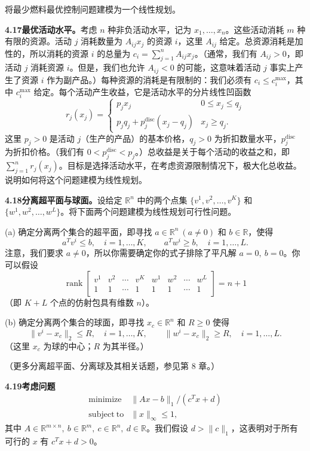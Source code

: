 \documentclass[UTF8, 12pt, fontset=fandol, oneside]{ctexart}
\begin{document}
将最少燃料最优控制问题建模为一个线性规划。

\noindent\textbf{4.17\quad 最优活动水平。}\quad 考虑 $n$ 种非负活动水平，记为 $x_1,\ldots,x_n$。这些活动消耗 $m$ 种有限的资源。活动 $j$ 消耗数量为 $A_{ij}x_j$ 的资源 $i$，这里 $A_{ij}$ 给定。总资源消耗是加性的，所以消耗的资源 $i$ 的总量为 $c_i=\sum_{j=1}^n A_{ij}x_j$。（通常，我们有 $A_{ij}>0$，即活动 $j$ 消耗资源 $i$。但是，我们也允许 $A_{ij}<0$ 的可能，这意味着活动 $j$ 事实上产生了资源 $i$ 作为副产品。）每种资源的消耗是有限制的：我们必须有 $c_i\leq c_i^{\max}$，其中 $c_i^{\max}$ 给定。每个活动产生收益，它是活动水平的分片线性凹函数
\[
r_j(x_j)=
\begin{cases}
p_jx_j & 0\leq x_j\leq q_j\\
p_jq_j+p_j^{\mathrm{disc}}(x_j-q_j) & x_j\geq q_j.
\end{cases}
\]
这里 $p_j>0$ 是活动 $j$（生产的产品）的基本价格，$q_j>0$ 为折扣数量水平，$p_j^{\mathrm{disc}}$ 为折扣价格。（我们有 $0<p_j^{\mathrm{disc}}<p_j$。）总收益是关于每个活动的收益之和，即 $\sum_{j=1}^n r_j(x_j)$。目标是选择活动水平，在考虑资源限制情况下，极大化总收益。说明如何将这个问题建模为线性规划。

\noindent\textbf{4.18\quad 分离超平面与球面。}\quad 设给定 $\mathbb{R}^n$ 中的两个点集 $\{v^1,v^2,\ldots,v^K\}$ 和 $\{w^1,w^2,\ldots,w^L\}$。将下面两个问题建模为线性规划可行性问题。

(a) 确定分离两个集合的超平面，即寻找 $a\in\mathbb{R}^n\ (a\neq0)$ 和 $b\in\mathbb{R}$，使得
\[
a^Tv^i\leq b,\quad i=1,\ldots,K,\qquad a^Tw^i\geq b,\quad i=1,\ldots,L.
\]
注意，我们要求 $a\neq0$，所以你需要确定你的式子排除了平凡解 $a=0,\ b=0$。你可以假设
\[
\operatorname{rank}\begin{bmatrix}
v^1 & v^2 & \cdots & v^K & w^1 & w^2 & \cdots & w^L\\
1 & 1 & \cdots & 1 & 1 & 1 & \cdots & 1
\end{bmatrix}=n+1
\]
（即 $K+L$ 个点的仿射包具有维数 $n$）。

(b) 确定分离两个集合的球面，即寻找 $x_c\in\mathbb{R}^n$ 和 $R\geq0$ 使得
\[
\|v^i-x_c\|_2\leq R,\quad i=1,\ldots,K,\qquad \|w^i-x_c\|_2\geq R,\quad i=1,\ldots,L.
\]
（这里 $x_c$ 为球的中心；$R$ 为其半径。）

（更多分离超平面、分离球及其相关话题，参见第 8 章。）

\noindent\textbf{4.19\quad 考虑问题}
\[
\begin{array}{ll}
\mathop{\mathrm{minimize}} & \|Ax-b\|_1/(c^Tx+d)\\
\mathrm{subject\ to} & \|x\|_\infty\leq1,
\end{array}
\]
其中 $A\in\mathbb{R}^{m\times n},\ b\in\mathbb{R}^m,\ c\in\mathbb{R}^n,\ d\in\mathbb{R}$。我们假设 $d>\|c\|_1$，这表明对于所有可行的 $x$ 有 $c^Tx+d>0$。
\end{document}
